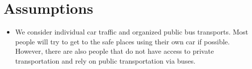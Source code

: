 \documentclass{mcmthesis}	%
\begin{document}
\section{Assumptions}%

\begin{itemize}%
\item We consider individual car traffic and organized public bus transports.
  Most people will try to get to the safe places using their own car if possible. However, there are also people that do not have access to private transportation and rely on public transportation via buses.
%
\end{itemize}
\end{document}

